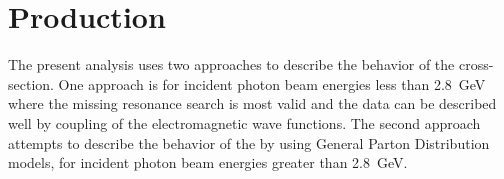 \section{\piz Production} \label{sec:into:xsection}
The present analysis uses two approaches to describe the behavior of the \piz cross-section. One approach is for incident photon beam energies less than 2.8~GeV where the missing resonance search is most valid and the data can be described well by coupling of the \piz electromagnetic wave functions. The second approach attempts to describe the behavior of the \piz by using General Parton Distribution models,  for incident photon beam energies greater than 2.8~GeV.




